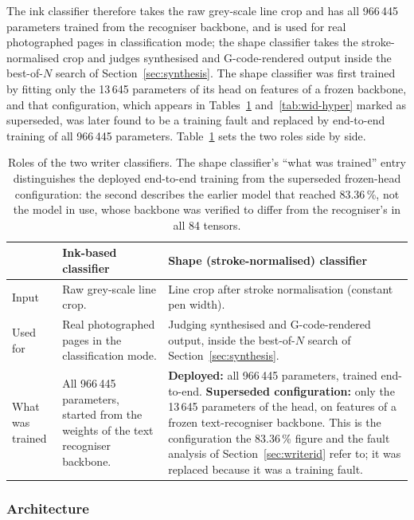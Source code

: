 The ink classifier therefore takes the raw grey-scale line crop and has all 966\,445 parameters trained from the recogniser backbone, and is used for real photographed pages in classification mode; the shape classifier takes the stroke-normalised crop and judges synthesised and G-code-rendered output inside the best-of-$N$ search of Section~\ref{sec:synthesis}.
The shape classifier was first trained by fitting only the 13\,645 parameters of its head on features of a frozen backbone, and that configuration, which appears in Tables~\ref{tab:wid-roles} and~\ref{tab:wid-hyper} marked as superseded, was later found to be a training fault and replaced by end-to-end training of all 966\,445 parameters.
Table~\ref{tab:wid-roles} sets the two roles side by side.

\begin{table}[h]
\centering
\fontsize{9.5}{11.5}\selectfont
\begin{tabularx}{\linewidth}{|p{3.3cm}|X|X|}
\hline
& \textbf{Ink-based classifier} & \textbf{Shape (stroke-normalised) classifier} \\
\hline
Input & Raw grey-scale line crop. & Line crop after stroke normalisation (constant pen width). \\
\hline
Used for & Real photographed pages in the classification mode. & Judging synthesised and G-code-rendered output, inside the best-of-$N$ search of Section~\ref{sec:synthesis}. \\
\hline
What was trained & All 966\,445 parameters, started from the weights of the text recogniser backbone. & \textbf{Deployed:} all 966\,445 parameters, trained end-to-end. \newline \textbf{Superseded configuration:} only the 13\,645 parameters of the head, on features of a frozen text-recogniser backbone. This is the configuration the 83.36\,\% figure and the fault analysis of Section~\ref{sec:writerid} refer to; it was replaced because it was a training fault. \\
\hline
\end{tabularx}
\caption{Roles of the two writer classifiers. The shape classifier's ``what was trained'' entry distinguishes the deployed end-to-end training from the superseded frozen-head configuration: the second describes the earlier model that reached 83.36\,\%, not the model in use, whose backbone was verified to differ from the recogniser's in all 84 tensors.}
\label{tab:wid-roles}
\end{table}

\subsubsection{Architecture}

